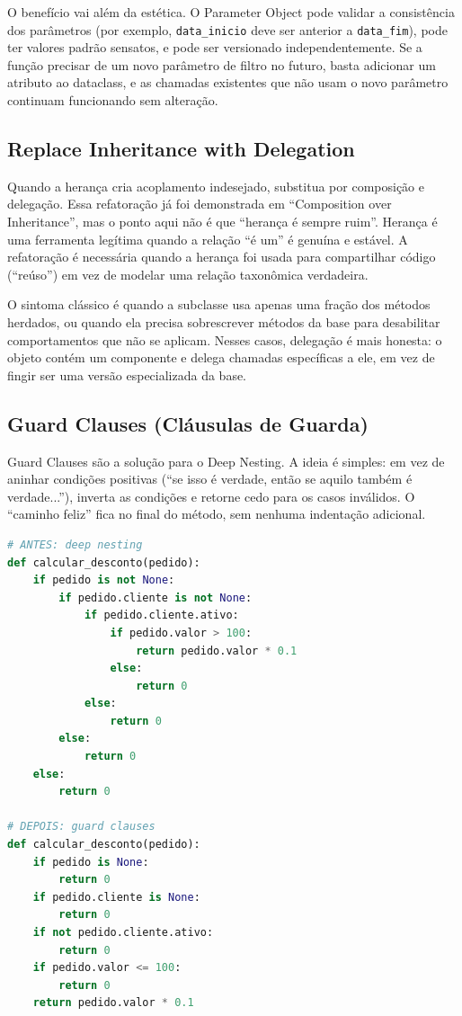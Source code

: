 O benefício vai além da estética. O Parameter Object pode validar a
consistência dos parâmetros (por exemplo, \texttt{data\_inicio} deve ser
anterior a \texttt{data\_fim}), pode ter valores padrão sensatos, e pode
ser versionado independentemente. Se a função precisar de um
novo parâmetro de filtro no futuro, basta adicionar um atributo ao
dataclass, e as chamadas existentes que não usam o novo parâmetro
continuam funcionando sem alteração.

\subsection{Replace Inheritance with Delegation}

Quando a herança cria acoplamento indesejado, substitua por composição e
delegação. Essa refatoração já foi demonstrada em ``Composition over
Inheritance'', mas o ponto aqui não é que ``herança é sempre
ruim''. Herança é uma ferramenta legítima quando a relação ``é um'' é
genuína e estável. A refatoração é necessária quando a herança foi usada
para compartilhar código (``reúso'') em vez de modelar uma relação
taxonômica verdadeira.

O sintoma clássico é quando a subclasse usa apenas uma fração dos métodos
herdados, ou quando ela precisa sobrescrever métodos da base para desabilitar
comportamentos que não se aplicam. Nesses casos, delegação é mais honesta:
o objeto contém um componente e delega chamadas específicas a ele, em vez
de fingir ser uma versão especializada da base.

\subsection{Guard Clauses (Cláusulas de Guarda)}

Guard Clauses são a solução para o Deep Nesting. A ideia é simples: em vez
de aninhar condições positivas (``se isso é verdade, então se aquilo também
é verdade...''), inverta as condições e retorne cedo para os casos inválidos.
O ``caminho feliz'' fica no final do método, sem nenhuma indentação adicional.

\begin{lstlisting}[language=Python, caption={Refatoração: Guard Clauses}]
# ANTES: deep nesting
def calcular_desconto(pedido):
    if pedido is not None:
        if pedido.cliente is not None:
            if pedido.cliente.ativo:
                if pedido.valor > 100:
                    return pedido.valor * 0.1
                else:
                    return 0
            else:
                return 0
        else:
            return 0
    else:
        return 0

# DEPOIS: guard clauses
def calcular_desconto(pedido):
    if pedido is None:
        return 0
    if pedido.cliente is None:
        return 0
    if not pedido.cliente.ativo:
        return 0
    if pedido.valor <= 100:
        return 0
    return pedido.valor * 0.1
\end{lstlisting}

